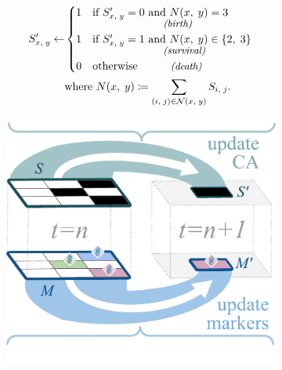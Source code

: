 \begin{figure}

\begin{minipage}[c]{1.0\linewidth}%
\vspace*{0pt}%
\begin{subfigure}[]{0.35\linewidth}
    \centering
\begin{align*}
    S_{\fontsize{2}{12} \selectfont x,\; y}'
    \gets&
    \begin{cases}
        1 & \text{if } S_{\fontsize{2}{12} \selectfont x,\; y}' = 0 \text{ and } N(x,\; y) = 3\\[-1ex]
          &\hspace{15ex}\text{\small\textit{(birth)}}\\
        1 & \text{if } S_{\fontsize{2}{12} \selectfont x,\; y}' = 1 \text{ and } N(x,\; y) \in \{2,\; 3\}\\[-1ex]
          &\hspace{15ex}\text{\small\textit{(survival)}}\\
        0 & \text{otherwise} \hspace{7ex}\text{\small\textit{(death)}}
    \end{cases}\\
    & \text{where } N(x,\; y) \coloneqq \sum_{(i,\; j) \in \mathcal{N}(x,\; y)} S_{\fontsize{2}{12} \selectfont i,\; j}.
\end{align*}
\vspace{-3.7ex}
    \includegraphics[width=\linewidth, trim={0 0.5cm 0 0}, clip]{img/ca-marker-update.pdf}\vspace{-2.5ex}

\end{subfigure}
\end{minipage}
\end{figure}
